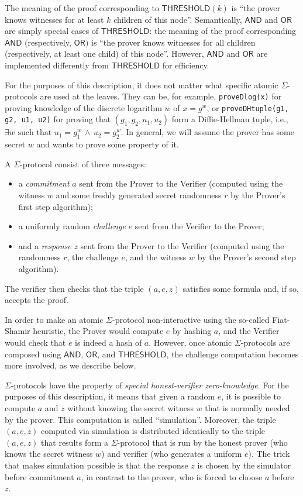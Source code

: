 \documentclass[11pt]{article}
\newcommand{\andnode}{\ensuremath{\mathsf{AND}}}
\newcommand{\ornode}{\ensuremath{\mathsf{OR}}}
\newcommand{\tnode}{\ensuremath{\mathsf{THRESHOLD}}}
\begin{document}
The meaning of the proof corresponding to $\tnode(k)$ is ``the prover knows witnesses for at least $k$ children of this node''. Semantically, $\andnode$ and $\ornode$ are simply special cases of $\tnode$: the meaning  of the proof corresponding $\andnode$ (respectively, $\ornode)$ is ``the prover knows witnesses for all children (respectively, at least one child) of this node''. However, $\andnode$ and $\ornode$ are implemented differently from $\tnode$ for efficiency.

For the purposes of this description, it does not matter what specific atomic $\Sigma$-protocols are used at the leaves. They can be, for example, \texttt{proveDlog(x)} for proving knowledge of the discrete logarithm $w$ of $x=g^w$, or \texttt{proveDHtuple(g1, g2, u1, u2)} for proving that $(g_1, g_2, u_1, u_2)$ form a Diffie-Hellman tuple, i.e., $\exists w \mbox{\ such\  that\ } u_1 = g_1^w \, \wedge \, u_2 = g_2^w$. In general, we will assume the prover has some secret $w$ and wants to prove some property of it.

A $\Sigma$-protocol consist of three messages:

\begin{itemize}
\item a \emph{commitment} $a$ sent from the Prover to the Verifier (computed using the witness $w$ and some freshly generated secret randomness $r$ by the Prover's first step algorithm);
\item a uniformly random \emph{challenge} $e$ sent from the Verifier to the Prover;
\item and a \emph{response} $z$ sent from the Prover to the Verifier (computed using the randomness $r$, the challenge $e$, and the witness $w$ by the Prover's second step algorithm).
\end{itemize}
The verifier then checks that the triple $(a, e, z)$ satisfies some formula and, if so, accepts the proof.

In order to make an atomic $\Sigma$-protocol non-interactive using the so-called Fiat-Shamir heuristic, the Prover would compute $e$ by hashing $a$, and the Verifier would check that $e$ is indeed a hash of $a$. However, once atomic $\Sigma$-protocols are composed using $\andnode$, $\ornode$, and $\tnode$, the challenge computation becomes more involved, as we describe below.

$\Sigma$-protocols have the property of \emph{special honest-verifier zero-knowledge}. For the purposes of this description, it means that given a random $e$, it is possible to compute $a$ and $z$ without knowing the secret witness $w$ that is normally needed by the prover. This computation is called ``simulation''. Moreover, the triple $(a, e, z)$  computed via simulation is distributed identically to the triple $(a, e, z)$ that results form a $\Sigma$-protocol that is run by the honest prover (who knows the secret witness $w$) and verifier (who generates a uniform $e$). The trick that makes simulation possible is that the response $z$ is chosen by the simulator before commitment $a$, in contrast to the prover, who is forced to choose $a$ before $z$.
\end{document}
